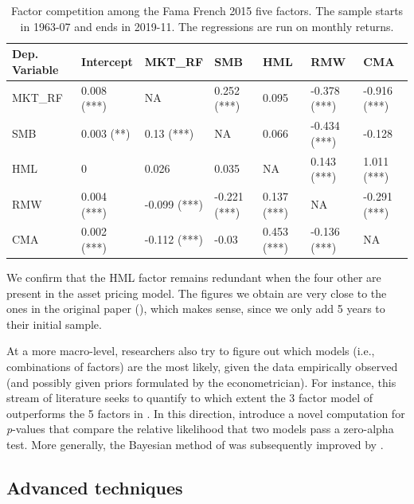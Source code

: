\documentclass[]{krantz}
\theoremstyle{definition}
\theoremstyle{definition}
\theoremstyle{definition}
\theoremstyle{remark}
\begin{document}
\begin{table}[t]

\caption{\label{tab:faccompet2}Factor competition among the Fama French 2015 five factors. The sample starts in 1963-07 and ends in 2019-11. The regressions are run on monthly returns. }
\centering
\fontsize{9}{11}\selectfont
\begin{tabular}{lllllll}
\toprule
Dep. Variable & Intercept & MKT\_RF & SMB & HML & RMW & CMA\\
\midrule
MKT\_RF & 0.008  (***) & NA & 0.252  (***) & 0.095 & -0.378  (***) & -0.916  (***)\\
SMB & 0.003  (**) & 0.13  (***) & NA & 0.066 & -0.434  (***) & -0.128\\
HML & 0 & 0.026 & 0.035 & NA & 0.143  (***) & 1.011  (***)\\
RMW & 0.004  (***) & -0.099  (***) & -0.221  (***) & 0.137  (***) & NA & -0.291  (***)\\
CMA & 0.002  (***) & -0.112  (***) & -0.03 & 0.453  (***) & -0.136  (***) & NA\\
\bottomrule
\end{tabular}
\end{table}

\normalsize

We confirm that the HML factor remains redundant when the four other are
present in the asset pricing model. The figures we obtain are very close
to the ones in the original paper (\citet{fama2015five}), which makes
sense, since we only add 5 years to their initial sample.

At a more macro-level, researchers also try to figure out which models
(i.e., combinations of factors) are the most likely, given the data
empirically observed (and possibly given priors formulated by the
econometrician). For instance, this stream of literature seeks to
quantify to which extent the 3 factor model of \citet{fama1993common}
outperforms the 5 factors in \citet{fama2015five}. In this direction,
\citet{de2015comparing} introduce a novel computation for
\emph{p}-values that compare the relative likelihood that two models
pass a zero-alpha test. More generally, the Bayesian method of
\citet{barillas2018comparing} was subsequently improved by
\citet{chib2019comparing}.

\hypertarget{advanced-techniques}{%
\subsection{Advanced techniques}\label{advanced-techniques}}
\end{document}
